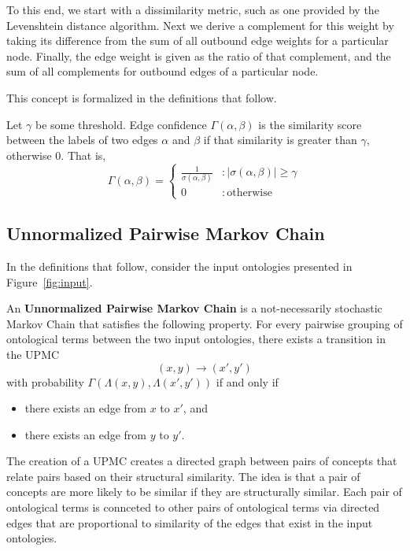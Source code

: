 \documentclass[letterpaper,twocolumn,12pt]{article}
\begin{document}
To this end, we start with a dissimilarity metric, such as one provided
by the Levenshtein distance algorithm. Next we derive a complement for this
weight by taking its difference from the sum of all outbound edge weights
for a particular node. Finally, the edge weight is given as the ratio of
that complement, and the sum of all complements for outbound edges of a
particular node.

This concept is formalized in the definitions that follow.

\begin{defn}
\label{edgeconfidence}
Let $\gamma$ be some threshold. Edge confidence $\Gamma \left( \alpha, \beta \right)$ is the similarity score between the labels of two edges $\alpha$ and $\beta$ if that similarity is greater than $\gamma$, otherwise $0$. That is,
$$ \Gamma \left( \alpha, \beta \right) = \left\{
   	 \begin{array}{ll}
           \frac{1}{\sigma \left( \alpha, \beta \right)} & : \vert \sigma \left( \alpha, \beta \right) \vert \geq \gamma \\
           0                                             & : \mathrm{otherwise}
     \end{array}
   \right.$$
\end{defn}

\subsection{Unnormalized Pairwise Markov Chain}
In the definitions that follow, consider the input ontologies 
presented in Figure~\ref{fig:input}.

\begin{defn}
An {\bf Unnormalized Pairwise Markov Chain} is a not-necessarily stochastic Markov Chain that satisfies the following property.
For every pairwise grouping of ontological terms between the two input ontologies, there exists a transition in the UPMC
$$ (x, y) \rightarrow (x', y') $$
with probability $\Gamma(\Lambda(x, y), \Lambda(x', y'))$ if and only if
\begin{itemize}
\item there exists an edge from $x$ to $x'$, and
\item there exists an edge from $y$ to $y'$.
\end{itemize}
\end{defn}

The creation of a UPMC creates a directed graph between pairs of concepts that relate 
pairs based on their structural similarity.
The idea is that a pair of concepts are more likely to be similar if they are structurally similar.
Each pair of ontological terms is connceted to other pairs of ontological terms via directed 
edges that are proportional to similarity of the edges that exist in the input ontologies. 
\end{document}
